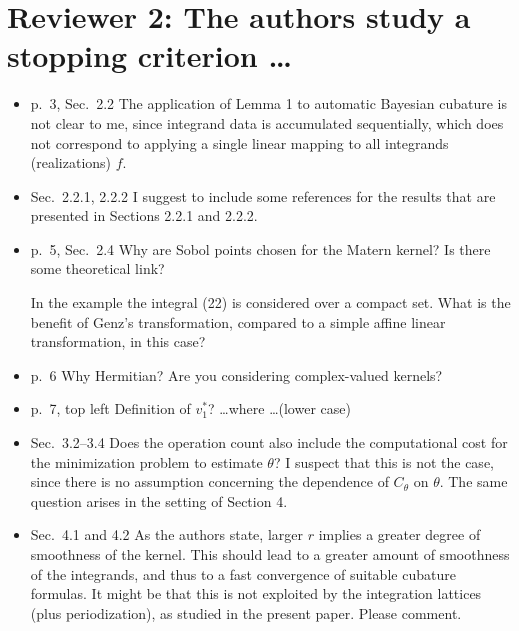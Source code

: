 \documentclass{amsart}
\begin{document}
\section*{Reviewer 2: The authors study a stopping criterion \ldots}

\begin{itemize}
\item p.\ 3, Sec.\ 2.2 The application of Lemma 1 to automatic Bayesian cubature is not clear to me, since integrand data is accumulated sequentially, which does not correspond to applying a single linear mapping to all integrands (realizations) $f$.

\item Sec.\ 2.2.1, 2.2.2 I suggest to include some references for the results that are presented in Sections 2.2.1 and 2.2.2.

\item p.\ 5, Sec.\ 2.4 Why are Sobol points chosen for the Matern kernel? Is there some theoretical link?  

In the example the integral (22) is considered over a compact set. What is the benefit of Genz’s transformation, compared to a simple affine linear transformation, in this case?

\item p.\ 6 Why Hermitian? Are you considering complex-valued kernels? 

\item p.\ 7, top left Definition of $v_1^*$? \ldots where \ldots (lower case) 

\item Sec.\ 3.2--3.4 Does the operation count also include the computational cost for the minimization problem to estimate $\theta$? I suspect that this is not the case, since there is no assumption concerning the dependence of $C_\theta$ on $\theta$. The same question arises in the setting of Section 4.  

\item Sec.\ 4.1 and 4.2 As the authors state, larger $r$ implies a greater degree of smoothness of the kernel. This should lead to a greater amount of smoothness of the integrands, and thus to a fast convergence of suitable cubature formulas. It might be that this is not exploited by the integration lattices (plus periodization), as studied in the present paper. Please comment.


\end{itemize}
\end{document}
